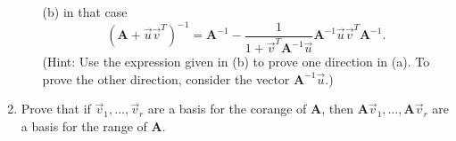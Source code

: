 \documentclass[11pt,fleqn]{article}
\newcommand{\mat}[1]{\mathbf{#1}}
\begin{document}
\begin{enumerate}
\begin{itemize}
	\item[(b)] in that case
	\[\left(\mathbf{A}+\vec{u}\vec{v}^T\right)^{-1} = \mat{A}^{-1} - \frac{1}{1+\vec{v}^T\mathbf{A}^{-1}\vec{u}}\mat{A}^{-1}\vec{u}\vec{v}^T\mat{A}^{-1}.\]
	(Hint: Use the expression given in (b) to prove one direction in (a). To prove the other direction, consider the vector $\mathbf{A}^{-1}\vec{u}$.)
	\end{itemize}
\item Prove that if $\vec{v}_1,\ldots,\vec{v}_r$ are a basis for the corange of $\mathbf{A}$, then $\mathbf{A}\vec{v}_1,\ldots,\mathbf{A}\vec{v}_r$ are a basis for the range of $\mathbf{A}$.
\end{enumerate}
 
\end{document}
